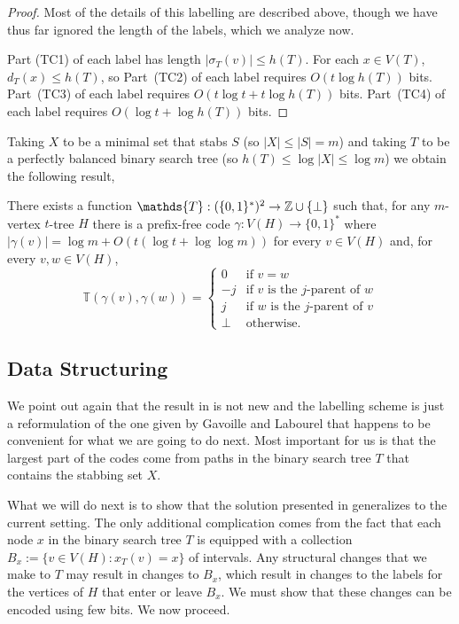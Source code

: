 \documentclass[kpfonts]{patmorin}
\begin{document}
\begin{proof}
  Most of the details of this labelling are described above, though we have thus far ignored the length of the labels, which we analyze now.
  
  Part (TC1) of each label has length $|\sigma_T(v)|\le h(T)$.  For each $x\in V(T)$, $d_T(x)\le h(T)$, so Part~(TC2) of each label requires $O(t\log h(T))$ bits.  Part~(TC3) of each label requires $O(t\log t + t\log h(T))$ bits.  Part~(TC4) of each label requires $O(\log t + \log h(T))$ bits.
\end{proof}

Taking $X$ to be a minimal set that stabs $S$ (so $|X|\le |S|=m$) and taking $T$ to be a perfectly balanced binary search tree (so $h(T)\le \log|X|\le\log m$) we obtain the following result,

\begin{cor}
  There exists a function $\mathds{T}:(\{0,1\}^*)^2\to \Z\cup\{\perp\}$ such that, for any $m$-vertex $t$-tree $H$ there is a prefix-free code $\gamma:V(H)\to\{0,1\}^*$ where $|\gamma(v)|=\log m + O(t(\log t + \log\log m))$ for every $v\in V(H)$ and, for every $v,w\in V(H)$, 
  \[
      \mathds{T}(\gamma(v),\gamma(w)) = \begin{cases}
      0 & \text{if $v=w$} \\
      -j & \text{if $v$ is the $j$-parent of $w$} \\
      j & \text{if $w$ is the $j$-parent of $v$} \\
      \perp & \text{otherwise.}
    \end{cases}
  \]
\end{cor}


\subsection{Data Structuring}

We point out again that the result in  is not new and the labelling scheme is just a reformulation of the one given by Gavoille and Labourel \cite{gavoille.labourel:shorter} that happens to be convenient for what we are going to do next. Most important for us is that the largest part of the codes come from paths in the binary search tree $T$ that contains the stabbing set $X$.  

What we will do next is to show that the solution presented in  generalizes to the current setting.  The only additional complication comes from the fact that each node $x$ in the binary search tree $T$ is equipped with a collection $B_x:=\{v\in V(H):x_T(v)=x\}$ of intervals.  Any structural changes that we make to $T$ may result in changes to $B_x$, which result in changes to the labels for the vertices of $H$ that enter or leave $B_x$.  We must show that these changes can be encoded using few bits.  We now proceed.
\end{document}
